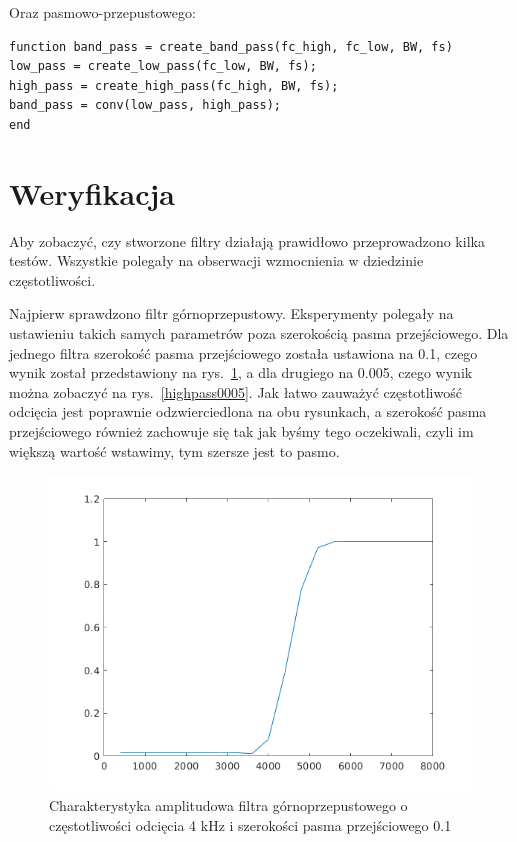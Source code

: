 Oraz pasmowo-przepustowego:

\begin{lstlisting}[style=Matlab-editor]
function band_pass = create_band_pass(fc_high, fc_low, BW, fs)
low_pass = create_low_pass(fc_low, BW, fs);
high_pass = create_high_pass(fc_high, BW, fs);
band_pass = conv(low_pass, high_pass);
end
\end{lstlisting}

\section{Weryfikacja}
Aby zobaczyć, czy stworzone filtry działają prawidłowo przeprowadzono kilka testów.
Wszystkie polegały na obserwacji wzmocnienia w dziedzinie częstotliwości.

Najpierw sprawdzono filtr górnoprzepustowy.
Eksperymenty polegały na ustawieniu takich samych parametrów poza szerokością pasma przejściowego.
Dla jednego filtra szerokość pasma przejściowego została ustawiona na \num{0.1}, czego wynik został przedstawiony na rys.~\ref{highpass01}, a dla drugiego na \num{0.005}, czego wynik można zobaczyć na rys.~\ref{highpass0005}.
Jak łatwo zauważyć częstotliwość odcięcia jest poprawnie odzwierciedlona na obu rysunkach, a szerokość pasma przejściowego również zachowuje się tak jak byśmy tego oczekiwali, czyli im większą wartość wstawimy, tym szersze jest to pasmo.

\begin{figure}
\centering
\includegraphics{dane/highpass01.png} %
\caption{Charakterystyka amplitudowa filtra górnoprzepustowego o częstotliwości odcięcia \num{4} kHz i szerokości pasma przejściowego \num{0.1}}
\label{highpass01}
\end{figure}


